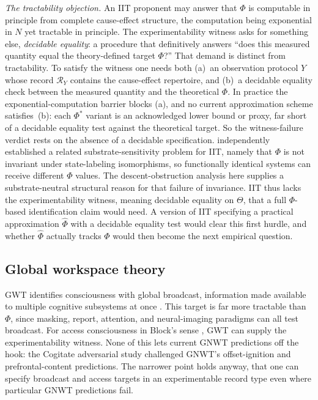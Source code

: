 \documentclass[11pt]{article}
\begin{document}
\textit{The tractability objection.}
An IIT proponent may answer that $\Phi$ is computable in principle from complete
cause-effect structure, the computation being exponential in $N$ yet tractable
in principle. The experimentability witness asks for something else,
\emph{decidable equality}: a procedure that definitively answers ``does this
measured quantity equal the theory-defined target $\Phi$?'' That demand is
distinct from tractability. To satisfy the witness one needs both (a)~an
observation protocol $Y$ whose record $\mathcal{R}_Y$ contains the cause-effect
repertoire, and (b)~a decidable equality check between the measured quantity and
the theoretical $\Phi$. In practice the exponential-computation barrier blocks
(a), and no current approximation scheme satisfies~(b): each $\Phi^*$ variant is
an
acknowledged lower bound or proxy, far short of a decidable equality test against
the theoretical target. So the witness-failure verdict rests on the absence of a
decidable specification. \citet{hanson2019iit} independently established a
related substrate-sensitivity problem for IIT, namely that $\Phi$ is not
invariant under state-labeling isomorphisms, so functionally identical systems
can receive different $\Phi$ values. The descent-obstruction analysis here
supplies a substrate-neutral structural reason for that failure of invariance.
IIT thus lacks the experimentability witness, meaning decidable equality on
$\Theta$, that a full $\Phi$-based identification claim would need. A version of
IIT specifying a practical approximation $\hat\Phi$ with a decidable equality
test would clear this first hurdle, and whether $\hat\Phi$ actually tracks
$\Phi$ would then become the next empirical question.


\subsection{Global workspace theory}
\label{sec:gwt}

GWT identifies consciousness with global broadcast, information made available to
multiple cognitive subsystems at once \citep{baars1988,dehaene2011}. This target
is far more tractable than $\Phi$, since masking, report, attention, and
neural-imaging paradigms can all test broadcast. For access consciousness in
Block's sense \citep{block1995}, GWT can supply the experimentability witness.
None of this lets current GNWT predictions off the hook: the Cogitate
adversarial study challenged GNWT's offset-ignition and prefrontal-content
predictions. The narrower point holds anyway, that one can specify broadcast and
access targets in an experimentable record type even where particular GNWT
predictions fail.
\end{document}
